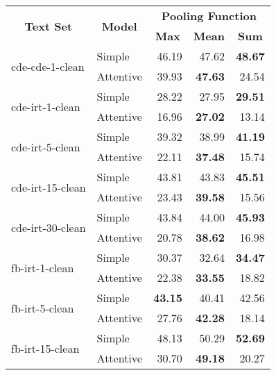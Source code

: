 \begin{tabular}{| l | l | r | r | r |}
    \hline

    \multicolumn{1}{|c|}{\multirow{2}{*}{\textbf{Text Set}}} &
    \multicolumn{1}{|c|}{\multirow{2}{*}{\textbf{Model}}} &
    \multicolumn{3}{|c|}{\textbf{Pooling Function}} \\

    &
    &
    \multicolumn{1}{|c|}{\textbf{Max}} &
    \multicolumn{1}{|c|}{\textbf{Mean}} &
    \multicolumn{1}{|c|}{\textbf{Sum}} \\

    \hline \hline

    \multirow{2}{*}{cde-cde-1-clean}
    & Simple    & 46.19 & 47.62 & \textbf{48.67} \\
    & Attentive & 39.93 & \textbf{47.63} & 24.54 \\ \hline
    
    \multirow{2}{*}{cde-irt-1-clean}
    & Simple    & 28.22 & 27.95 & \textbf{29.51} \\
    & Attentive & 16.96 & \textbf{27.02} & 13.14 \\ \hline
    
    \multirow{2}{*}{cde-irt-5-clean}
    & Simple    & 39.32 & 38.99 & \textbf{41.19} \\
    & Attentive & 22.11 & \textbf{37.48} & 15.74 \\ \hline
    
    \multirow{2}{*}{cde-irt-15-clean}
    & Simple    & 43.81 & 43.83 & \textbf{45.51} \\
    & Attentive & 23.43 & \textbf{39.58} & 15.56 \\ \hline
    
    \multirow{2}{*}{cde-irt-30-clean}
    & Simple    & 43.84 & 44.00 & \textbf{45.93} \\
    & Attentive & 20.78 & \textbf{38.62} & 16.98 \\ \hline \hline
    
    \multirow{2}{*}{fb-irt-1-clean}
    & Simple    & 30.37 & 32.64 & \textbf{34.47} \\
    & Attentive & 22.38 & \textbf{33.55} & 18.82 \\ \hline
    
    \multirow{2}{*}{fb-irt-5-clean}
    & Simple    & \textbf{43.15} & 40.41 & 42.56 \\
    & Attentive & 27.76 & \textbf{42.28} & 18.14 \\ \hline
    
    \multirow{2}{*}{fb-irt-15-clean}
    & Simple    & 48.13 & 50.29 & \textbf{52.69} \\
    & Attentive & 30.70 & \textbf{49.18} & 20.27 \\ \hline
    

\end{tabular}
